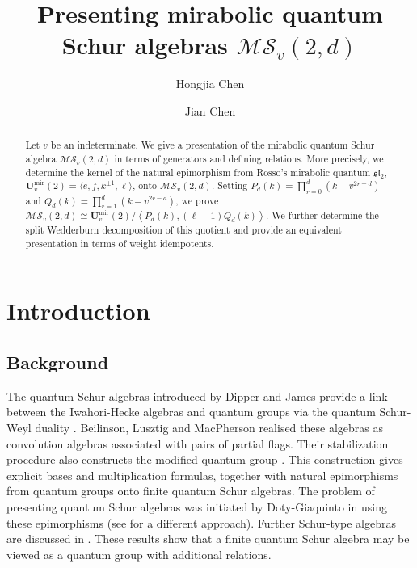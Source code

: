 \documentclass[12pt]{amsart}
\title{Presenting mirabolic quantum Schur algebras $\mathcal{MS}_v(2,d)$}
\author{Hongjia Chen}
\author{Jian Chen}
\date{}
\numberwithin{equation}{section}
\theoremstyle{definition}
\theoremstyle{definition}
\begin{document}
\begin{abstract}
Let $v$ be an indeterminate. 
We give a presentation of the mirabolic quantum Schur algebra $\mathcal{MS}_v(2,d)$ in terms of generators and defining relations. 
More precisely, we determine the kernel of the natural epimorphism from Rosso's mirabolic quantum $\mathfrak{sl}_2$, 
$\mathbf U^{\mathrm{mir}}_v(2)=\langle e,f,k^{\pm 1},\ell\rangle$, onto $\mathcal{MS}_v(2,d)$. 
Setting $P_d(k)=\prod_{r=0}^{d}(k-v^{2r-d})$ and $Q_d(k)=\prod_{r=1}^{d}(k-v^{2r-d})$, we prove
$\mathcal{MS}_v(2,d)\cong \mathbf U^{\mathrm{mir}}_v(2)/ \left\langle P_d(k),(\ell-1)Q_d(k)\right\rangle$. 
We further determine the split Wedderburn decomposition of this quotient and provide an equivalent presentation in terms of weight idempotents.
\end{abstract}


\maketitle
\tableofcontents

\section{Introduction}
\subsection{Background}
The quantum Schur algebras introduced by Dipper and James provide a link between the Iwahori-Hecke algebras and quantum groups via the quantum Schur-Weyl duality \cite{Jim86,DJ89}. Beilinson, Lusztig and MacPherson realised these algebras as convolution algebras associated with pairs of partial flags. Their stabilization procedure also constructs the modified quantum group \cite{BLM90}. This construction gives explicit bases and multiplication formulas, together with natural epimorphisms from quantum groups onto finite quantum Schur algebras. 
The problem of presenting quantum Schur algebras was initiated by Doty-Giaquinto in \cite{DG02} using these epimorphisms 
(see \cite{DP03} for a different approach). 
Further Schur-type algebras are discussed in \cite{Dot03,DG07,Wad11,DW15,FS26,CD26}. These results show that a finite quantum Schur algebra may be viewed as a quantum group with additional relations.
\end{document}
